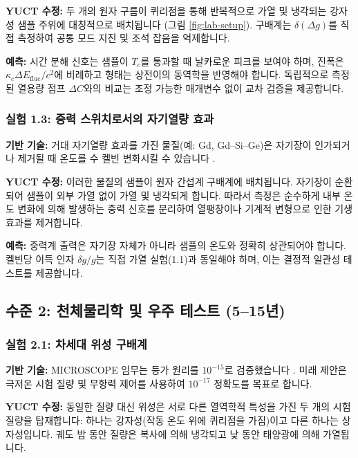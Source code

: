 \documentclass[11pt,a4paper]{article}
\begin{document}
	\textbf{YUCT 수정:} 두 개의 원자 구름이 퀴리점을 통해 반복적으로 가열 및 냉각되는 강자성 샘플 주위에 대칭적으로 배치됩니다 (그림 \ref{fig:lab-setup}). 구배계는 $\delta(\Delta g)$를 직접 측정하여 공통 모드 지진 및 조석 잡음을 억제합니다.
	
	\textbf{예측:} 시간 분해 신호는 샘플이 $T_c$를 통과할 때 날카로운 피크를 보여야 하며, 진폭은 $\kappa_c \Delta E_{\mathrm{fluc}}/c^2$에 비례하고 형태는 상전이의 동역학을 반영해야 합니다. 독립적으로 측정된 열용량 점프 $\Delta C$와의 비교는 조정 가능한 매개변수 없이 교차 검증을 제공합니다.
	
	\subsubsection{실험 1.3: 중력 스위치로서의 자기열량 효과}
	
	\textbf{기반 기술:} 거대 자기열량 효과를 가진 물질(예: Gd, Gd–Si–Ge)은 자기장이 인가되거나 제거될 때 온도를 수 켈빈 변화시킬 수 있습니다 \cite{Gschneidner1999}.
	
	\textbf{YUCT 수정:} 이러한 물질의 샘플이 원자 간섭계 구배계에 배치됩니다. 자기장이 순환되어 샘플이 외부 가열 없이 가열 및 냉각되게 합니다. 따라서 측정은 순수하게 내부 온도 변화에 의해 발생하는 중력 신호를 분리하여 열팽창이나 기계적 변형으로 인한 기생 효과를 제거합니다.
	
	\textbf{예측:} 중력계 출력은 자기장 자체가 아니라 샘플의 온도와 정확히 상관되어야 합니다. 켈빈당 이득 인자 $\delta g/g$는 직접 가열 실험(1.1)과 동일해야 하며, 이는 결정적 일관성 테스트를 제공합니다.
	
	\subsection{수준 2: 천체물리학 및 우주 테스트 (5–15년)}
	\label{subsec:space-tests}
	
	\subsubsection{실험 2.1: 차세대 위성 구배계}
	
	\textbf{기반 기술:} MICROSCOPE 임무는 등가 원리를 $10^{-15}$로 검증했습니다 \cite{Touboul2022}. 미래 제안은 극저온 시험 질량 및 무항력 제어를 사용하여 $10^{-17}$ 정확도를 목표로 합니다.
	
	\textbf{YUCT 수정:} 동일한 질량 대신 위성은 서로 다른 열역학적 특성을 가진 두 개의 시험 질량을 탑재합니다: 하나는 강자성(작동 온도 위에 퀴리점을 가짐)이고 다른 하나는 상자성입니다. 궤도 밤 동안 질량은 복사에 의해 냉각되고 낮 동안 태양광에 의해 가열됩니다.
	
\end{document}
